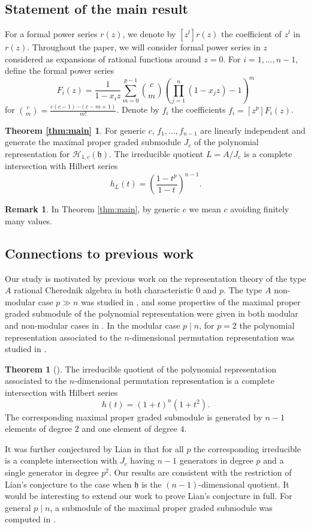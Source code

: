 \documentclass{amsart}
\numberwithin{equation}{section}
\theoremstyle{definition}
\newtheorem{theorem}{Theorem}[section]
\newtheorem*{remark}{Remark}
\newcommand{\h}{\mathfrak{h}}
\newcommand{\HH}{\mathcal{H}}
\begin{document}
\subsection{Statement of the main result}

For a formal power series $r(z)$, we denote by $[z^l] r(z)$ the coefficient of $z^l$ in $r(z)$.  Throughout the paper, we will consider formal power series in $z$ considered as expansions of rational functions around $z = 0$. For $i = 1, \ldots, n - 1$, define the formal power series
\[
F_i(z)=\frac{1}{1-x_iz} \sum_{m=0}^{p-1} \binom{c}{m}\left(\prod_{j=1}^{n} (1-x_jz) - 1\right)^m
\]
for $\binom{c}{m} = \frac{c (c - 1) \cdots (c - m + 1)}{m!}$.  Denote by $f_i$ the coefficients $f_i = [z^p] F_i(z)$.

\newtheorem*{thm:main}{Theorem \ref{thm:main}} \begin{thm:main}
For generic $c$, $f_1, \ldots, f_{n-1}$ are linearly independent and generate the maximal proper graded submodule $J_c$ of the polynomial representation for $\HH_{1, c}(\h)$.  The irreducible quotient $L = A/J_c$ is a complete intersection with Hilbert series 
\[
h_L(t) = \left(\frac{1-t^p}{1-t}\right)^{n-1}.
\]
\end{thm:main}
\begin{remark}
In Theorem \ref{thm:main}, by generic $c$ we mean $c$ avoiding finitely many values.
\end{remark}

\subsection{Connections to previous work}

Our study is motivated by previous work on the representation theory of the type $A$ rational Cherednik algebra in both characteristic $0$ and $p$.  The type $A$ non-modular case $p \gg n$ was studied in \cite{BFG}, and some properties of the maximal proper graded submodule of the polynomial representation were given in both modular and non-modular cases in \cite{BC1}.  In the modular case $p \mid n$, for $p = 2$ the polynomial representation associated to the $n$-dimensional permutation representation was studied in \cite{L}.
\begin{theorem}[{\cite[Theorem 5.1]{L}}] \label{thm:lian}
The irreducible quotient of the polynomial representation associated to the $n$-dimensional permutation representation is a complete intersection with Hilbert series
\[
h(t) = (1 + t)^n (1 + t^2).
\]
The corresponding maximal proper graded submodule is generated by $n - 1$ elements of degree $2$ and one element of degree $4$. 
\end{theorem} 
It was further conjectured by Lian in \cite[Conjecture 5.2]{L} that for all $p$ the corresponding irreducible is a complete intersection with $J_c$ having $n - 1$ generators in degree $p$ and a single generator in degree $p^2$.  Our results are consistent with the restriction of Lian's conjecture to the case when $\h$ is the $(n - 1)$-dimensional quotient.  It would be interesting to extend our work to prove Lian's conjecture in full.  For general $p \mid n$, a submodule of the maximal proper graded submodule was computed in \cite[Proposition 6.1]{DS}.
\end{document}
